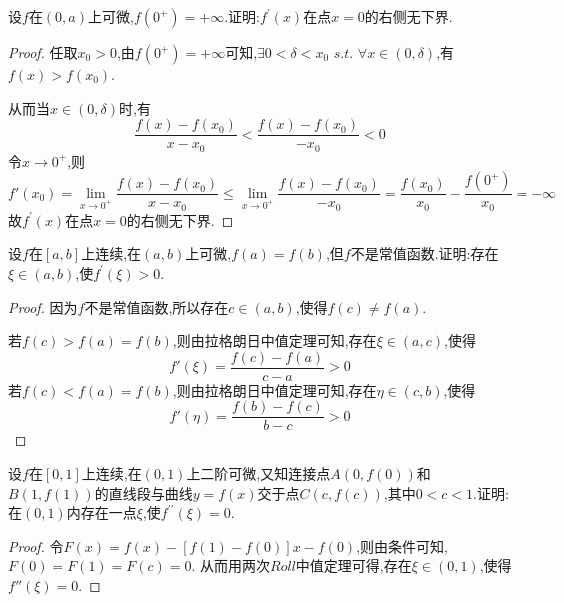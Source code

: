 \documentclass[lang=cn,newtx,10pt,scheme=chinese]{../Template/elegantbook}
\begin{document}
\begin{exercise}
    设\(f\)在\((0,a)\)上可微,\(f(0^{+}) = +\infty\).证明:\(f^{\prime}(x)\)在点\(x = 0\)的右侧无下界.
    \begin{proof}
    任取$x_0>0$,由\(f(0^{+}) = +\infty\)可知,$\exists 0<\delta<x_0\,\,s.t.\,\,\forall x\in(0,\delta)$,有$f(x)>f(x_0)$.
    
    从而当$x\in(0,\delta)$时,有
    \begin{equation}
        \frac{f(x)-f(x_0)}{x-x_0}<\frac{f(x)-f(x_0)}{-x_0}<0
        \nonumber
    \end{equation}
    令$x\to0^{+}$,则
    \begin{equation}
        f'(x_0)=\underset{x\rightarrow 0^+}{\lim}\frac{f(x)-f(x_0)}{x-x_0}\leqslant \underset{x\rightarrow 0^+}{\lim}\frac{f(x)-f(x_0)}{-x_0}=\frac{f\left( x_0 \right)}{x_0}-\frac{f\left( 0^+ \right)}{x_0}=-\infty 
        \nonumber
    \end{equation}
    故\(f^{\prime}(x)\)在点\(x = 0\)的右侧无下界.
    
\end{proof}
\end{exercise}

\begin{exercise}
    设\(f\)在\([a,b]\)上连续,在\((a,b)\)上可微,\(f(a)=f(b)\),但\(f\)不是常值函数.证明:存在\(\xi\in(a,b)\),使\(f^{\prime}(\xi)>0\).
    \begin{proof}
    因为\(f\)不是常值函数,所以存在$c\in(a,b)$,使得$f(c)\ne f(a)$.
    
    若$f(c)>f(a)=f(b)$,则由拉格朗日中值定理可知,存在$\xi\in(a,c)$,使得
    \begin{equation}
        f'\left( \xi \right) =\frac{f\left( c \right) -f\left( a \right)}{c-a}>0
        \nonumber
    \end{equation}
    若$f(c)<f(a)=f(b)$,则由拉格朗日中值定理可知,存在$\eta\in(c,b)$,使得
    \begin{equation}
        f'\left( \eta \right) =\frac{f\left( b \right) -f\left( c \right)}{b-c}>0
        \nonumber
    \end{equation}
    
\end{proof}
\end{exercise}

\begin{exercise}
    设\(f\)在\([0,1]\)上连续,在\((0,1)\)上二阶可微,又知连接点\(A(0,f(0))\)和\(B(1,f(1))\)的直线段与曲线\(y = f(x)\)交于点\(C(c,f(c))\),其中\(0<c<1\).证明:在\((0,1)\)内存在一点\(\xi\),使\(f^{\prime\prime}(\xi)=0\).
    \begin{proof}
    令$F(x)=f(x)-[f(1)-f(0)]x-f(0)$,则由条件可知,$F(0)=F(1)=F(c)=0$.
    从而用两次$Roll$中值定理可得,存在$\xi\in(0,1)$,使得$f''(\xi)=0$.
    
\end{proof}
\end{exercise}
\end{document}
